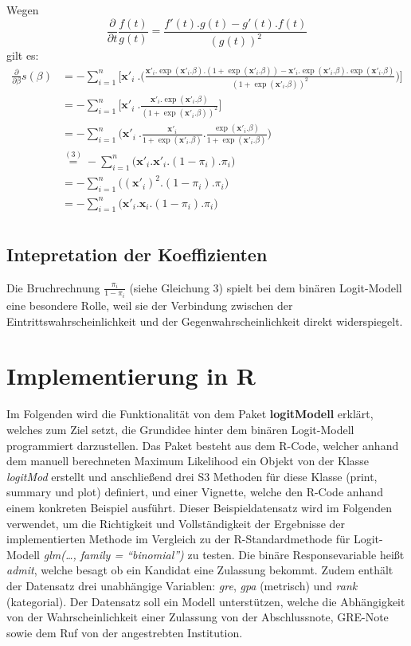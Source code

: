 \documentclass[12pt,]{article}
\begin{document}
Wegen \[
\frac{\partial}{\partial t} \frac{f(t)}{g(t)} = \frac{f'(t).g(t) - g'(t).f(t)}{(g(t))^2}
\] gilt es: \[
\begin{aligned}
\frac{\partial}{\partial \beta} s(\beta) &= - \sum_{i = 1}^{n} \Bigg[ \mathbf{x'}_i \ . \Bigg( \frac{\mathbf{x'}_i.\exp(\mathbf{x'}_i.\beta).(1+\exp(\mathbf{x'}_i.\beta))-\mathbf{x'}_i.\exp(\mathbf{x'}_i.\beta).\exp(\mathbf{x'}_i.\beta)}{(1+\exp(\mathbf{x'}_i.\beta))^2} \Bigg) \Bigg] \\
&= - \sum_{i = 1}^{n} \Bigg[ \mathbf{x'}_i \ . \frac{\mathbf{x'}_i.\exp(\mathbf{x'}_i.\beta)}{(1+\exp(\mathbf{x'}_i.\beta))^2}  \Bigg] \\
&= - \sum_{i = 1}^{n} \Bigg( \mathbf{x'}_i \ . \frac{\mathbf{x'}_i}{1+\exp(\mathbf{x'}_i.\beta)} . \frac{\exp(\mathbf{x'}_i.\beta)}{1+\exp(\mathbf{x'}_i.\beta)} \Bigg) \\
&\mathrel{\overset{(3)}{=}} - \sum_{i = 1}^{n} \Big( \mathbf{x'}_i . \mathbf{x'}_i . (1-\pi_i) . \pi_i \Big) \\
&= - \sum_{i = 1}^{n} \Big( (\mathbf{x'}_i)^2 . (1-\pi_i) . \pi_i \Big) \\
&= - \sum_{i = 1}^{n} \Big( \mathbf{x'}_i.\mathbf{x}_i . (1-\pi_i) . \pi_i \Big) \\
\end{aligned}
\]

\subsection{Intepretation der
Koeffizienten}\label{intepretation-der-koeffizienten}

Die Bruchrechnung \(\frac{\pi_i}{1-\pi_i}\) (siehe Gleichung 3) spielt
bei dem binären Logit-Modell eine besondere Rolle, weil sie der
Verbindung zwischen der Eintrittswahrscheinlichkeit und der
Gegenwahrscheinlichkeit direkt widerspiegelt.

\section{Implementierung in R}\label{implementierung-in-r}

Im Folgenden wird die Funktionalität von dem Paket \textbf{logitModell}
erklärt, welches zum Ziel setzt, die Grundidee hinter dem binären
Logit-Modell programmiert darzustellen. Das Paket besteht aus dem
R-Code, welcher anhand dem manuell berechneten Maximum Likelihood ein
Objekt von der Klasse \emph{logitMod} erstellt und anschließend drei S3
Methoden für diese Klasse (print, summary und plot) definiert, und einer
Vignette, welche den R-Code anhand einem konkreten Beispiel ausführt.
Dieser Beispieldatensatz wird im Folgenden verwendet, um die Richtigkeit
und Vollständigkeit der Ergebnisse der implementierten Methode im
Vergleich zu der R-Standardmethode für Logit-Modell \emph{glm(\ldots{},
family = ``binomial'')} zu testen. Die binäre Responsevariable heißt
\emph{admit}, welche besagt ob ein Kandidat eine Zulassung bekommt.
Zudem enthält der Datensatz drei unabhängige Variablen: \emph{gre},
\emph{gpa} (metrisch) und \emph{rank} (kategorial). Der Datensatz soll
ein Modell unterstützen, welche die Abhängigkeit von der
Wahrscheinlichkeit einer Zulassung von der Abschlussnote, GRE-Note sowie
dem Ruf von der angestrebten Institution.
\end{document}
